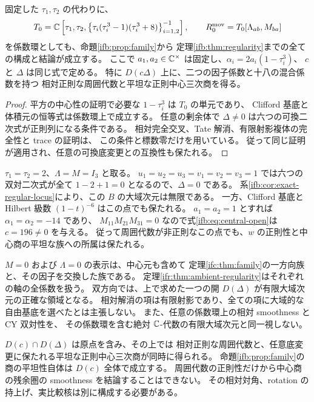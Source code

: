 \begin{corollary}
\label{ifb:cor:moving-factors}
固定した $\tau_1,\tau_2$ の代わりに、
\[
 T_0=\mathbb C\left[\tau_1,\tau_2,
       \left\{\tau_i(\tau_i^3-1)(\tau_i^3+8)\right\}_{i=1,2}^{-1}\right],
 \qquad R_0^{\mathrm{mov}}=T_0[\Lambda_{ab},M_{ba}]
\]
を係数環としても、命題\ref{ifb:prop:family}から
定理\ref{ifb:thm:regularity}までの全ての構成と結論が成立する。
ここで $a_1,a_2\in\mathbb C^\times$ は固定し、$\alpha_i=2a_i(1-\tau_i^3)$、
$c$ と $\Delta$ は同じ式で定める。
特に $D(c\Delta)$ 上に、二つの因子係数と十八の混合係数を持つ
相対正則な周囲代数と平坦な正則中心三次商を得る。
\end{corollary}

\begin{proof}
平方の中心性の証明で必要な $1-\tau_i^3$ は $T_0$ の単元であり、
Clifford 基底と体積元の恒等式は係数環上で成立する。
任意の剰余体で $\Delta\ne0$ は六つの可換二次式が正則列になる条件である。
相対完全交叉、Tate 解消、有限射影複体の完全性と trace の証明は、
この条件と標数零だけを用いている。
従って同じ証明が適用され、任意の可換底変更との互換性も保たれる。
\end{proof}

\begin{example}
\label{ifb:ex:nonregular}
$\tau_1=\tau_2=2$、$\Lambda=M=I_3$ と取る。
$u_1=u_2=u_3=v_1=v_2=v_3=1$ では六つの双対二次式が全て
$1-2+1=0$ となるので、$\Delta=0$ である。
系\ref{ifb:cor:exact-regular-locus}により、この $B$ の大域次元は無限である。
一方、Clifford 基底と Hilbert 級数 $(1-t)^{-6}$ はこの点でも保たれる。
$a_1=a_2=1$ とすれば $\alpha_1=\alpha_2=-14$ であり、
$M_{11}M_{21}M_{31}=0$ なので式\eqref{ifb:eq:central-open}は $c=196\ne0$ を与える。
従って周囲代数が非正則なこの点でも、$w$ の正則性と中心商の平坦な族への所属は保たれる。
\end{example}

\begin{remark}
\label{ifb:rem:scope}
$M=0$ および $\Lambda=0$ の表示は、中心元も含めて
定理\ref{ifc:thm:family}の一方向族と、その因子を交換した族である。
定理\ref{ifr:thm:ambient-regularity}はそれぞれの軸の全係数を扱う。
双方向では、上で求めた一つの開 $D(\Delta)$ が有限大域次元の正確な領域となる。
相対解消の項は有限射影であり、全ての項に大域的な自由基底を選べたとは主張しない。
また、任意の係数環上の相対 smoothness と CY 双対性を、
その係数環を含む絶対 $\mathbb C$-代数の有限大域次元と同一視しない。

$D(c)\cap D(\Delta)$ は原点を含み、その上では
相対正則な周囲代数と、任意底変更に保たれる平坦な正則中心三次商が同時に得られる。
命題\ref{ifb:prop:family}の商の平坦性自体は $D(c)$ 全体で成立する。
周囲代数の正則性だけから中心商の残余圏の smoothness を結論することはできない。
その相対対角、rotation の持上げ、実比較核は別に構成する必要がある。
\end{remark}
